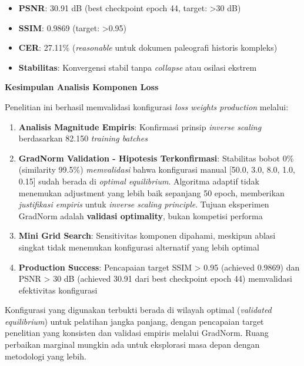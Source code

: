 \documentclass[12pt,a4paper]{article}
\begin{document}
\begin{itemize}[leftmargin=*]
    \item \textbf{PSNR}: 30.91 dB (best checkpoint epoch 44, target: >30 dB) \checkmark 
    \item \textbf{SSIM}: 0.9869 (target: >0.95) \checkmark
    \item \textbf{CER}: 27.11\% (\textit{reasonable} untuk dokumen paleografi historis kompleks)
    \item \textbf{Stabilitas}: Konvergensi stabil tanpa \textit{collapse} atau osilasi ekstrem
\end{itemize}

\textbf{Kesimpulan Analisis Komponen Loss}

Penelitian ini berhasil memvalidasi konfigurasi \textit{loss weights production} melalui:
\begin{enumerate}[leftmargin=*]
    \item \textbf{Analisis Magnitude Empiris}: Konfirmasi prinsip \textit{inverse scaling} berdasarkan 82.150 \textit{training batches}
    \item \textbf{GradNorm Validation - Hipotesis Terkonfirmasi}: Stabilitas bobot 0\% (similarity 99.5\%) \textit{memvalidasi} bahwa konfigurasi manual [50.0, 3.0, 8.0, 1.0, 0.15] sudah berada di \textit{optimal equilibrium}. Algoritma adaptif tidak menemukan adjustment yang lebih baik sepanjang 50 epoch, memberikan \textit{justifikasi empiris} untuk \textit{inverse scaling principle}. Tujuan eksperimen GradNorm adalah \textbf{validasi optimality}, bukan kompetisi performa
    \item \textbf{Mini Grid Search}: Sensitivitas komponen dipahami, meskipun ablasi singkat tidak menemukan konfigurasi alternatif yang lebih optimal
    \item \textbf{Production Success}: Pencapaian target SSIM > 0.95 (achieved 0.9869) dan PSNR > 30 dB (achieved 30.91 dari best checkpoint epoch 44) memvalidasi efektivitas konfigurasi
\end{enumerate}

Konfigurasi yang digunakan terbukti berada di wilayah optimal (\textit{validated equilibrium}) untuk pelatihan jangka panjang, dengan pencapaian target penelitian yang konsisten dan validasi empiris melalui GradNorm. Ruang perbaikan marginal mungkin ada untuk eksplorasi masa depan dengan metodologi yang lebih.

\vspace{0.5em}
\end{document}
